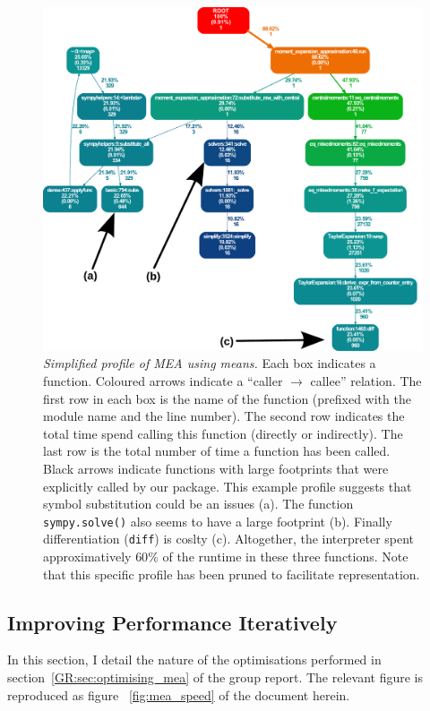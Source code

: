 \begin{figure}[tbh]
\begin{centering}
\includegraphics[width=0.83\textwidth{}]{profile.pdf}
\caption{\emph{Simplified profile of MEA using means.}
 Each box indicates a function.
 Coloured arrows indicate a ``caller $ \rightarrow $ callee'' relation.
 The first row in each box is the name of the function (prefixed with the module name and the line number).
 The second row indicates the total time spend calling this function (directly or indirectly).
 The last row is the total number of time a function has been called.
 Black arrows indicate \sympy{} functions with large footprints that were explicitly called by our package.
 This example profile suggests that symbol substitution could be an issues (a).
 The function \texttt{sympy.solve()} also seems to have a large footprint (b).
 Finally differentiation (\texttt{diff}) is coslty (c).
 Altogether, the interpreter spent approximatively $60\%$
 of the runtime in these three functions.
 Note that this specific profile has been pruned to facilitate representation.
}
\label{fig:profiled}
\end{centering}
\end{figure}


\subsection{Improving Performance Iteratively}
In this section, I detail the nature of the optimisations performed in section~\ref*{GR:sec:optimising_mea} of the group report.
The relevant figure is reproduced as figure ~\ref{fig:mea_speed} of the document herein.

